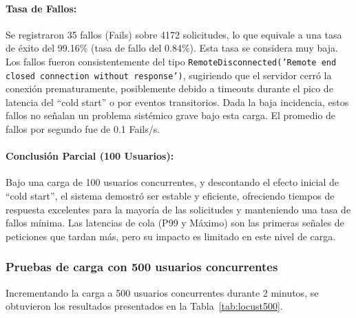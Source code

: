 \paragraph{Tasa de Fallos:}
Se registraron 35 fallos (Fails) sobre 4172 solicitudes, lo que equivale a una tasa de éxito del 99.16\% (tasa de fallo del 0.84\%). Esta tasa se considera muy baja. Los fallos fueron consistentemente del tipo \texttt{RemoteDisconnected('Remote end closed connection without response')}, sugiriendo que el servidor cerró la conexión prematuramente, posiblemente debido a timeouts durante el pico de latencia del ``cold start'' o por eventos transitorios. Dada la baja incidencia, estos fallos no señalan un problema sistémico grave bajo esta carga. El promedio de fallos por segundo fue de 0.1 Fails/s.

\paragraph{Conclusión Parcial (100 Usuarios):}
Bajo una carga de 100 usuarios concurrentes, y descontando el efecto inicial de ``cold start'', el sistema demostró ser estable y eficiente, ofreciendo tiempos de respuesta excelentes para la mayoría de las solicitudes y manteniendo una tasa de fallos mínima. Las latencias de cola (P99 y Máximo) son las primeras señales de peticiones que tardan más, pero su impacto es limitado en este nivel de carga.

\subsubsection{Pruebas de carga con 500 usuarios concurrentes}

Incrementando la carga a 500 usuarios concurrentes durante 2 minutos, se obtuvieron los resultados presentados en la Tabla~\ref{tab:locust500}.

\begin{table}[H]
\centering
{}
\caption{Resultados de la prueba de carga con 500 usuarios concurrentes.}
\label{tab:locust500}
\end{table}

